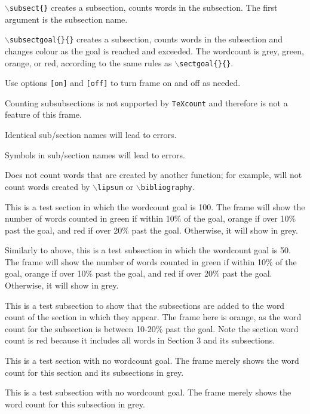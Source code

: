 \documentclass{article}
\begin{document}
\texttt{$\backslash$subsect\{\}} creates a subsection, counts words in the subsection. The first argument is the subsection name.

\texttt{$\backslash$subsectgoal\{\}\{\}} creates a subsection, counts words in the subsection and changes colour as the goal is reached and exceeded.  The wordcount is grey, green, orange, or red, according to the same rules as \texttt{$\backslash$sectgoal\{\}\{\}}.

Use options \texttt{[on]} and \texttt{[off]} to turn frame on and off as needed.


Counting subsubsections is not supported by \texttt{TeXcount} and therefore is not a feature of this frame.

Identical sub/section names will lead to errors.

Symbols in sub/section names will lead to errors.

Does not count words that are created by another function; for example, will not count words created by \texttt{$\backslash$lipsum} or \texttt{$\backslash$bibliography{}}.


This is a test section in which the wordcount goal is 100. The frame will show the number of words counted in green if within 10\% of the goal, orange if over 10\% past the goal, and red if over 20\% past the goal. Otherwise, it will show in grey.


Similarly to above, this is a test subsection in which the wordcount goal is 50. The frame will show the number of words counted in green if within 10\% of the goal, orange if over 10\% past the goal, and red if over 20\% past the goal. Otherwise, it will show in grey.


This is a test subsection to show that the subsections are added to the word count of the section in which they appear. The frame here is orange, as the word count for the subsection is between 10-20\% past the goal. Note the section word count is red because it includes all words in Section 3 and its subsections.


This is a test section with no wordcount goal. The frame merely shows the word count for this section and its subsections in grey.


This is a test subsection with no wordcount goal. The frame merely shows the word count for this subsection in grey.
\end{document}

